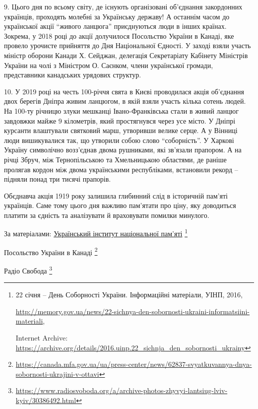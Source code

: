 
9. Цього дня по всьому світу, де існують організовані об'єднання закордонних
українців, проходять молебні за Українську державу! А останнім часом до
української акції \enquote{живого ланцюга} приєднуються люди в інших країнах.
Зокрема, у 2018 році до акції долучилося Посольство України в Канаді, яке
провело урочисте прийняття до Дня Національної Єдності. У заході взяли участь
міністр оборони Канади  Х. Сейджан, делегація Секретаріату Кабінету Міністрів
України на чолі з Міністром О. Саєнком, члени української громади, представники
канадських урядових структур.


10. У 2019 році на честь 100-річчя свята в Києві проводилася акція об'єднання
двох берегів Дніпра живим ланцюгом, в якій взяли участь кілька сотень людей. На
100-ту річницю злуки мешканці Івано-Франківська стали в живий ланцюг завдовжки
майже 9 кілометрів, який простягнувся через усе місто. У Дніпрі курсанти
влаштували святковий марш, утворивши велике серце. А у Вінниці люди
вишикувалися так, що утворили собою слово \enquote{соборність}. У Харкові Україну
символічно возз'єднав двома рушниками, які зв'язали прапором. А на річці Збруч,
між Тернопільською та Хмельницькою областями, де раніше пролягав кордон між
двома українськими республіками, встановили рекорд – підняли понад три тисячі
прапорів.

Обєднавча акція 1919 року залишила глибинний слід в історичній пам'яті
українців. Саме тому цього дня важливо пам'ятати про ціну, яку доводиться
платити за єдність та аналізувати й враховувати помилки минулого.

За матеріалами: \href{https://archive.org/details/2016.uinp.22_sichnja_den_sobornosti_ukrainy}{Український інститут національної пам'яті}%
\footnote{22 січня – День Соборності України. Інформаційні матеріали, УІНП, 2016, \par%
\url{http://memory.gov.ua/news/22-sichnya-den-sobornosti-ukraini-informatsiini-materiali}, \par%
Internet Archive: \url{https://archive.org/details/2016.uinp.22_sichnja_den_sobornosti_ukrainy}
}

Посольство України в Канаді
\footnote{\url{https://canada.mfa.gov.ua/ua/press-center/news/62837-svyatkuvannya-dnya-sobornosti-ukrajini-v-ottavi}}

Радіо Свобода
\footnote{\url{https://www.radiosvoboda.org/a/archive-photos-zhyvyi-lantsiug-lviv-kyiv/30386492.html}}
